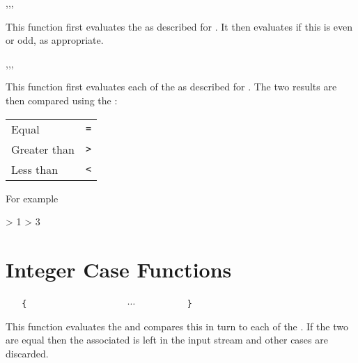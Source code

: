 \documentclass[oneside]{book}
\begin{document}
\begin{function}{\IntIfEven,\IntIfEvenT,\IntIfEvenF,\IntIfEvenTF}
\begin{syntax}
 
  
  
   
\end{syntax}
This function first evaluates the 
as described for .
It then evaluates if this is even or odd, as appropriate.
\end{function}

\begin{function}{\IntCompare,\IntCompareT,\IntCompareF,\IntCompareTF}
\begin{syntax}
   
    
    
     
\end{syntax}
This function first evaluates each of the 
as described for . The two results are then
compared using the :\par
{\centering\begin{tabular}{ll}
Equal        & \texttt{=} \\
Greater than & \texttt{>} \\
Less than    & \texttt{<} \\
\end{tabular}\par}
For example
\begin{demohigh}
 > {1} {} {}
 > {3} {} {}
\end{demohigh}
\end{function}

\section{Integer Case Functions}

\begin{function}{\IntCase}
\begin{syntax}
 
~ ~ \verb|{|
~ ~ ~ ~  
~ ~ ~ ~  
~ ~ ~ ~ $\cdots$
~ ~ ~ ~  
~ ~ \verb|}|
\end{syntax}
This function evaluates the  and
compares this in turn to each of the
. If the two are equal then the
associated  is left in the input stream
and other cases are discarded.
\end{function}
\end{document}
